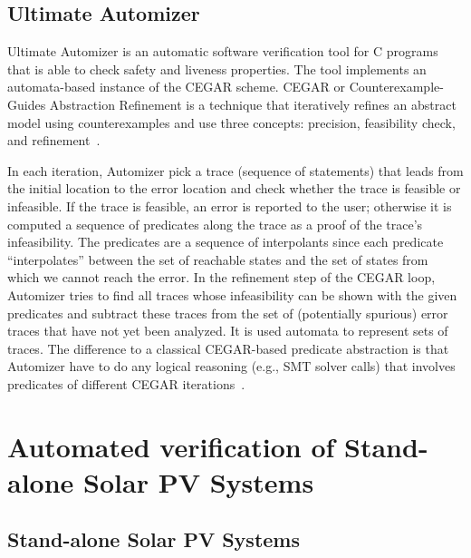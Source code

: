 \documentclass[runningheads]{llncs}
\begin{document}
\subsection{Ultimate Automizer}

Ultimate Automizer is an automatic software verification tool for C programs that is able to check safety and liveness properties. The tool implements an automata-based instance of the CEGAR scheme. CEGAR or Counterexample-Guides Abstraction Refinement is a technique that iteratively refines an abstract model using counterexamples and use three concepts: precision, feasibility check, and refinement~\cite{CEGAR}.

In each iteration, Automizer pick a trace (sequence of statements) that leads from the initial location to the error location and check whether the trace is feasible or infeasible. If the trace is feasible, an error is reported to the user; otherwise it is computed a sequence of predicates along the trace as a proof of the trace’s infeasibility. The predicates are a sequence of interpolants since each predicate “interpolates” between the set of reachable states and the set of states from which we cannot reach the error. In the refinement step of the CEGAR loop, Automizer tries to find all traces whose infeasibility can be shown with the given predicates and subtract these traces from the set of (potentially spurious) error traces that have not yet been analyzed. It is used automata to represent sets of traces. The difference to a classical CEGAR-based predicate abstraction is that Automizer have to do any logical reasoning (e.g., SMT solver calls) that involves predicates of different CEGAR iterations~\cite{Automizer2018}. 


\section{Automated verification of Stand-alone Solar PV Systems }
\label{sec:Methodology}

\subsection{Stand-alone Solar PV Systems}
\end{document}
